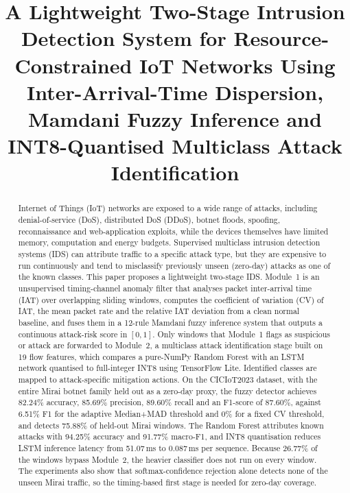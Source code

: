 \documentclass[]{interact}
\theoremstyle{plain}
\theoremstyle{definition}
\begin{document}

\title{A Lightweight Two-Stage Intrusion Detection System for Resource-Constrained IoT Networks Using Inter-Arrival-Time Dispersion, Mamdani Fuzzy Inference and INT8-Quantised Multiclass Attack Identification}

\author{
}

\maketitle

\begin{abstract}
Internet of Things (IoT) networks are exposed to a wide range of attacks, including denial-of-service (DoS), distributed DoS (DDoS), botnet floods, spoofing, reconnaissance and web-application exploits, while the devices themselves have limited memory, computation and energy budgets. Supervised multiclass intrusion detection systems (IDS) can attribute traffic to a specific attack type, but they are expensive to run continuously and tend to misclassify previously unseen (zero-day) attacks as one of the known classes. This paper proposes a lightweight two-stage IDS. Module~1 is an unsupervised timing-channel anomaly filter that analyses packet inter-arrival time (IAT) over overlapping sliding windows, computes the coefficient of variation (CV) of IAT, the mean packet rate and the relative IAT deviation from a clean normal baseline, and fuses them in a 12-rule Mamdani fuzzy inference system that outputs a continuous attack-risk score in $[0,1]$. Only windows that Module~1 flags as suspicious or attack are forwarded to Module~2, a multiclass attack identification stage built on 19 flow features, which compares a pure-NumPy Random Forest with an LSTM network quantised to full-integer INT8 using TensorFlow Lite. Identified classes are mapped to attack-specific mitigation actions. On the CICIoT2023 dataset, with the entire Mirai botnet family held out as a zero-day proxy, the fuzzy detector achieves 82.24\% accuracy, 85.69\% precision, 89.60\% recall and an F1-score of 87.60\%, against 6.51\% F1 for the adaptive Median+MAD threshold and 0\% for a fixed CV threshold, and detects 75.88\% of held-out Mirai windows. The Random Forest attributes known attacks with 94.25\% accuracy and 91.77\% macro-F1, and INT8 quantisation reduces LSTM inference latency from 51.07\,ms to 0.087\,ms per sequence. Because 26.77\% of the windows bypass Module~2, the heavier classifier does not run on every window. The experiments also show that softmax-confidence rejection alone detects none of the unseen Mirai traffic, so the timing-based first stage is needed for zero-day coverage.
\end{abstract}
\end{document}
